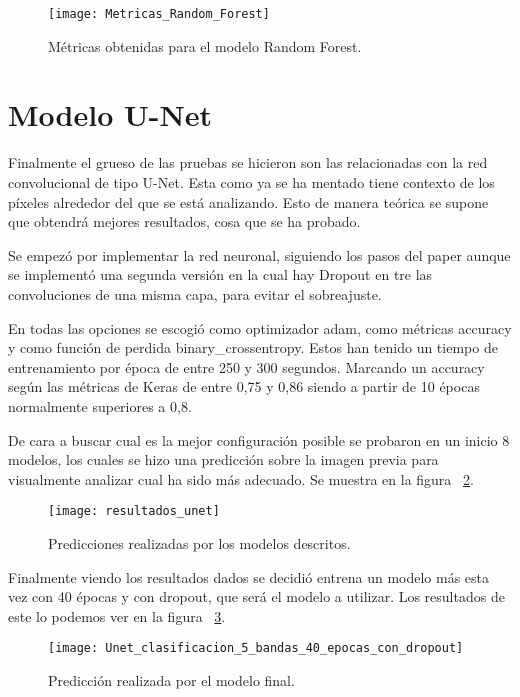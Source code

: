 \begin{figure}[H]
	\centering
	\texttt{[image: Metricas\_Random\_Forest]}
	\caption[Métricas obtenidas para el modelo Random Forest]{Métricas obtenidas para el modelo Random Forest.}
	\label{fig:metricas_rf}
\end{figure}

\section{Modelo U-Net}
Finalmente el grueso de las pruebas se hicieron son las relacionadas con la red convolucional de tipo U-Net. Esta como ya se ha mentado tiene contexto de los píxeles alrededor del que se está analizando. Esto de manera teórica se supone que obtendrá mejores resultados, cosa que se ha probado.

Se empezó por implementar la red neuronal, siguiendo los pasos del paper\cite{Unet} aunque se implementó una segunda versión en la cual hay Dropout en tre las convoluciones de una misma capa, para evitar el sobreajuste.

En todas las opciones se escogió como optimizador adam, como métricas accuracy y como función de perdida binary\_crossentropy. Estos han tenido un tiempo de entrenamiento por época de entre 250 y 300 segundos. Marcando un accuracy según las métricas de Keras de entre 0,75 y 0,86 siendo a partir de 10 épocas normalmente superiores a 0,8.

De cara a buscar cual es la mejor configuración posible se probaron en un inicio 8 modelos, los cuales se hizo una predicción sobre la imagen previa para visualmente analizar cual ha sido más adecuado. Se muestra en la figura ~\ref{fig:predicciones}.

\begin{figure}[H]
	\centering
	\texttt{[image: resultados\_unet]}
	\caption[Predicciones realizadas por los modelos descritos]{Predicciones realizadas por los modelos descritos.}
	\label{fig:predicciones}
\end{figure}

Finalmente viendo los resultados dados se decidió entrena un modelo más esta vez con 40 épocas y con dropout, que será el modelo a utilizar.
Los resultados de este lo podemos ver en la figura ~\ref{fig:prediccion_540c}.
	
\begin{figure}[H]
	\centering
	\texttt{[image: Unet\_clasificacion\_5\_bandas\_40\_epocas\_con\_dropout]}
	\caption[Predicción realizada por el modelo final]{Predicción realizada por el modelo final.}
	\label{fig:prediccion_540c}
\end{figure}

